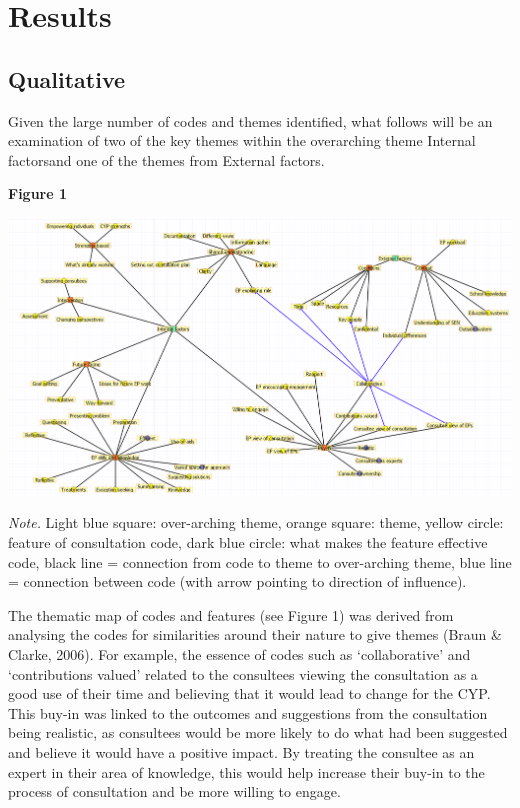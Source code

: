 \documentclass[
  english,
  man,floatsintext]{apa6}
\begin{document}
\hypertarget{results}{%
\section{Results}\label{results}}

\hypertarget{qualitative}{%
\subsection{Qualitative}\label{qualitative}}

Given the large number of codes and themes identified, what follows will be an examination of two of the key themes within the overarching theme Internal factorsand one of the themes from External factors.

\begin{landscape}

\textbf{Figure 1}

\includegraphics{Thematic_map.png}

\emph{Note.} Light blue square: over-arching theme, orange square: theme,
yellow circle: feature of consultation code, dark blue circle: what
makes the feature effective code, black line = connection from code to
theme to over-arching theme, blue line = connection between code (with
arrow pointing to direction of influence).

\end{landscape}

The thematic map of codes and features (see Figure 1) was derived from
analysing the codes for similarities around their nature to give themes
(Braun \& Clarke, 2006). For example, the essence of codes
such as `collaborative' and `contributions valued' related to the
consultees viewing the consultation as a good use of their time and
believing that it would lead to change for the CYP. This buy-in was
linked to the outcomes and suggestions from the consultation being
realistic, as consultees would be more likely to do what had been
suggested and believe it would have a positive impact. By treating the
consultee as an expert in their area of knowledge, this would help
increase their buy-in to the process of consultation and be more willing
to engage.
\end{document}
